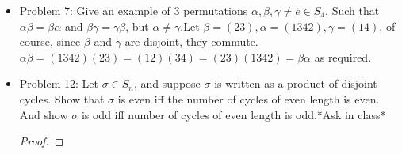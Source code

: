 \documentclass[hidelinks,12pt]{article}
\begin{document}
\begin{itemize}
\begin{proof}
\begin{enumerate}[label=(\roman*)]
        \item $n_a$ and $n_b$ will share a divisor, in this case, the lcm of the two is that shared (prime, and therefore squarefree) factor.
        \item $n_a$ and $n_b$ will be relatively prime, in this case, their product will be squarefree, so the denominator will be squarefree, as required.
    \end{enumerate}
    \end{proof}
    \item Problem 7: Give an example of 3 permutations $\alpha,\beta,\gamma\neq e\in S_4$. Such that $\alpha\beta=\beta\alpha$ and $\beta\gamma=\gamma\beta$, but $\alpha\neq\gamma$.\newline Let $\beta=(23),\alpha=(1342),\gamma=(14)$, of course, since $\beta$ and $\gamma$ are disjoint, they commute. $\alpha\beta=(1342)(23)=(12)(34)=(23)(1342)=\beta\alpha$ as required.
    \item Problem 12: Let $\sigma\in S_n$, and suppose $\sigma$ is written as a product of disjoint cycles. Show that $\sigma$ is even iff the number of cycles of even length is even. And show $\sigma$ is odd iff number of cycles of even length is odd.*Ask in class*\begin{proof}
    \end{proof}
\end{itemize}
\end{document}
